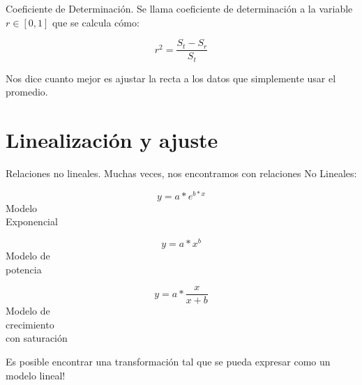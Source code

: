 \documentclass[xcolor=svgnames]{beamer} %
\theoremstyle{plain}
\theoremstyle{definition}
\begin{document}
\begin{frame}{Coeficiente de Determinación.}
Se llama coeficiente de determinación a la variable $r \in [0,1]$ que se calcula cómo:\pause

$$ r^2 = \frac{S_t - S_r}{S_t}$$

Nos dice cuanto mejor es ajustar la recta a los datos que simplemente usar el promedio.

\end{frame}

\section{Linealización y ajuste}


\begin{frame}{Relaciones no lineales.}
  Muchas veces, nos encontramos con relaciones No Lineales:\pause
  \begin{center}\begin{minipage}{.3\linewidth}
    $$y = a* e^{b*x}$$
    \center Modelo \\
    Exponencial
  \end{minipage}  \pause \begin{minipage}{.3\linewidth}
    $$y = a* x^{b}$$
    \center Modelo de \\
    potencia
  \end{minipage} \pause \begin{minipage}{.3\linewidth}
    $$y = a* \frac{x}{x+b}$$
    \center Modelo de \\
    crecimiento\\
    con saturación
  \end{minipage} \end{center}\pause
Es posible encontrar una transformación tal que se pueda expresar como un modelo lineal!
\end{frame}
\end{document}
